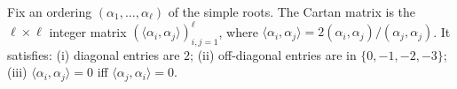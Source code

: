 Fix an ordering $(\alpha_1, \ldots, \alpha_\ell)$ of the simple roots. The Cartan matrix is the $\ell \times \ell$ integer matrix $(\langle \alpha_i, \alpha_j \rangle)_{i,j=1}^\ell$, where $\langle \alpha_i, \alpha_j \rangle = 2(\alpha_i, \alpha_j)/(\alpha_j, \alpha_j)$. It satisfies: (i) diagonal entries are $2$; (ii) off-diagonal entries are in $\{0, -1, -2, -3\}$; (iii) $\langle \alpha_i, \alpha_j \rangle = 0$ iff $\langle \alpha_j, \alpha_i \rangle = 0$.
